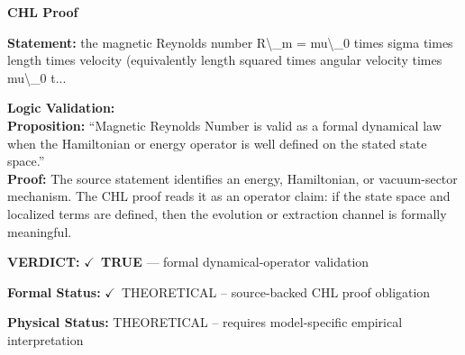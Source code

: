\vspace{0.45em}
\noindent\textbf{CHL Proof}\par
\textbf{Statement:} the magnetic Reynolds number R\textbackslash{}\_m = mu\textbackslash{}\_0 times sigma times length times velocity
(equivalently length squared times angular velocity times mu\textbackslash{}\_0 t...

\textbf{Logic Validation:}\\
\textbf{Proposition:} ``Magnetic Reynolds Number is valid as a formal dynamical law when the Hamiltonian or
energy operator is well defined on the stated state space.''\\
\textbf{Proof:} The source statement identifies an energy, Hamiltonian, or vacuum-sector mechanism. The
CHL proof reads it as an operator claim: if the state space and localized terms are
defined, then the evolution or extraction channel is formally meaningful.

\textbf{VERDICT:} \ensuremath{\checkmark}\ \textbf{TRUE} --- formal dynamical-operator validation

\textbf{Formal Status:} \ensuremath{\checkmark}\ THEORETICAL -- source-backed CHL proof obligation

\textbf{Physical Status:} THEORETICAL -- requires model-specific empirical interpretation
\par\vspace{0.45em}
\par
\ifTZPDarkEdition
{}
\fi
\endgroup
\endgroup
